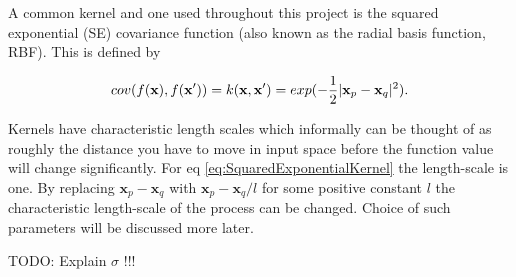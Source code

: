 \documentclass[12pt,a4paper]{report}
\theoremstyle{definition}
\begin{document}
A common kernel and one used throughout this project is the squared exponential (SE) covariance function (also known as the radial basis function, RBF). 
This is defined by

\begin{equation}
	\centering
	cov(f(\textbf{x}), f(\textbf{x}')) = k(\textbf{x}, \textbf{x}') = exp(-\frac{1}{2} |\textbf{x}_{p} - \textbf{x}_{q}|^2).
	\label{eq:SquaredExponentialKernel}
\end{equation}

Kernels have characteristic length scales which informally can be thought of as roughly the distance you have to move in input space before the function value will change significantly. 
For eq \ref{eq:SquaredExponentialKernel} the length-scale is one. 
By replacing $\textbf{x}_{p} - \textbf{x}_{q}$ with $\textbf{x}_{p} - \textbf{x}_{q} / l$ for some positive constant $l$ the characteristic length-scale of the process can be changed.
Choice of such parameters will be discussed more later.

TODO: Explain $\sigma$ !!!
\end{document}
